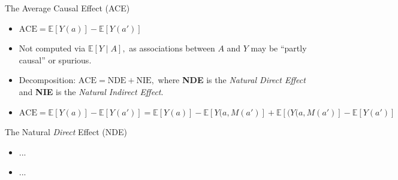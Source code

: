 \documentclass[12pt,t]{beamer}
\newcommand{\E}{\mathbb{E}}
\begin{document}

\begin{frame}[c]{The Average Causal Effect (ACE)}

\begin{center}
\begin{itemize}
  \itemsep10pt
  \item $\text{ACE} = \E[Y(a)] - \E[Y(a')]$
  \item Not computed via $\E[Y \mid A],$ as associations between $A$ and $Y$ may
    be ``partly causal'' or spurious.
  \item Decomposition: $\text{ACE} = \text{NDE} + \text{NIE},$ where
    \textbf{NDE} is the \textit{Natural Direct Effect} and \textbf{NIE} is the
    \textit{Natural Indirect Effect}.
  \item $\text{ACE} = \E[Y(a)] - \E[Y(a')] = \E[Y(a)] - \E[Y(a, M(a')] +
    \E[(Y(a, M(a')] - \E[Y(a')]$
\end{itemize}
\end{center}


\end{frame}


\begin{frame}[c]{The Natural \textit{Direct} Effect (NDE)}

\begin{center}
\begin{itemize}
  \item ...
  \item ...
\end{itemize}
\end{center}


\end{frame}

\end{document}
